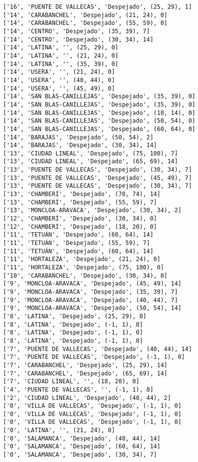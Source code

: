\documentclass[11pt]{article}
\begin{document}
\begin{Verbatim}[commandchars=\\\{\}]
['16', 'PUENTE DE VALLECAS', 'Despejado', (25, 29), 1]
['14', 'CARABANCHEL', 'Despejado', (21, 24), 0]
['14', 'CARABANCHEL', 'Despejado', (55, 59), 0]
['14', 'CENTRO', 'Despejado', (35, 39), 7]
['14', 'CENTRO', 'Despejado', (30, 34), 14]
['14', 'LATINA', '', (25, 29), 0]
['14', 'LATINA', '', (21, 24), 0]
['14', 'LATINA', '', (35, 39), 0]
['14', 'USERA', '', (21, 24), 0]
['14', 'USERA', '', (40, 44), 0]
['14', 'USERA', '', (45, 49), 0]
['14', 'SAN BLAS-CANILLEJAS', 'Despejado', (35, 39), 0]
['14', 'SAN BLAS-CANILLEJAS', 'Despejado', (35, 39), 0]
['14', 'SAN BLAS-CANILLEJAS', 'Despejado', (10, 14), 0]
['14', 'SAN BLAS-CANILLEJAS', 'Despejado', (50, 54), 0]
['14', 'SAN BLAS-CANILLEJAS', 'Despejado', (60, 64), 0]
['14', 'BARAJAS', 'Despejado', (50, 54), 2]
['14', 'BARAJAS', 'Despejado', (30, 34), 14]
['13', 'CIUDAD LINEAL', 'Despejado', (75, 100), 7]
['13', 'CIUDAD LINEAL', 'Despejado', (65, 69), 14]
['13', 'PUENTE DE VALLECAS', 'Despejado', (30, 34), 7]
['13', 'PUENTE DE VALLECAS', 'Despejado', (45, 49), 7]
['13', 'PUENTE DE VALLECAS', 'Despejado', (30, 34), 7]
['13', 'CHAMBERÍ', 'Despejado', (70, 74), 14]
['13', 'CHAMBERÍ', 'Despejado', (55, 59), 7]
['13', 'MONCLOA-ARAVACA', 'Despejado', (30, 34), 2]
['12', 'CHAMBERÍ', 'Despejado', (30, 34), 0]
['12', 'CHAMBERÍ', 'Despejado', (18, 20), 0]
['11', 'TETUÁN', 'Despejado', (60, 64), 14]
['11', 'TETUÁN', 'Despejado', (55, 59), 7]
['11', 'TETUÁN', 'Despejado', (60, 64), 14]
['11', 'HORTALEZA', 'Despejado', (21, 24), 0]
['11', 'HORTALEZA', 'Despejado', (75, 100), 0]
['10', 'CARABANCHEL', 'Despejado', (30, 34), 0]
['9', 'MONCLOA-ARAVACA', 'Despejado', (45, 49), 14]
['9', 'MONCLOA-ARAVACA', 'Despejado', (35, 39), 7]
['9', 'MONCLOA-ARAVACA', 'Despejado', (40, 44), 7]
['9', 'MONCLOA-ARAVACA', 'Despejado', (50, 54), 14]
['8', 'LATINA', 'Despejado', (25, 29), 0]
['8', 'LATINA', 'Despejado', (-1, 1), 0]
['8', 'LATINA', 'Despejado', (-1, 1), 0]
['8', 'LATINA', 'Despejado', (-1, 1), 0]
['7', 'PUENTE DE VALLECAS', 'Despejado', (40, 44), 14]
['7', 'PUENTE DE VALLECAS', 'Despejado', (-1, 1), 0]
['7', 'CARABANCHEL', 'Despejado', (25, 29), 14]
['7', 'CARABANCHEL', 'Despejado', (65, 69), 14]
['7', 'CIUDAD LINEAL', '', (18, 20), 0]
['4', 'PUENTE DE VALLECAS', '', (-1, 1), 0]
['2', 'CIUDAD LINEAL', 'Despejado', (40, 44), 2]
['0', 'VILLA DE VALLECAS', 'Despejado', (-1, 1), 0]
['0', 'VILLA DE VALLECAS', 'Despejado', (-1, 1), 0]
['0', 'VILLA DE VALLECAS', 'Despejado', (-1, 1), 0]
['0', 'LATINA', '', (21, 24), 0]
['0', 'SALAMANCA', 'Despejado', (40, 44), 14]
['0', 'SALAMANCA', 'Despejado', (60, 64), 14]
['0', 'SALAMANCA', 'Despejado', (30, 34), 7]

\end{Verbatim}
\end{document}
